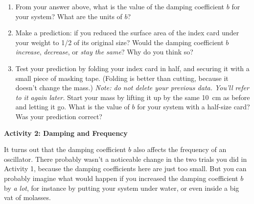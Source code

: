 \begin{enumerate}[labparts]
\item From your answer above, what is the value of the damping coefficient $b$ for your system?  What are the units of $b$? \label{b_for_full_index_card}
\answerspace{0.6in}

\item Make a prediction: if you reduced the surface area of the index card under your weight to 1/2 of its original size?  Would the damping coefficient $b$ \textit{increase}, \textit{decrease}, or \textit{stay the same}?  Why do you think so?
\answerspace{0.6in}

\item Test your prediction by folding your index card in half, and securing it with a small piece of masking tape.  (Folding is better than cutting, because it doesn't change the mass.) \textit{Note: do not delete your previous data.  You'll refer to it again later.}  Start your mass by lifting it up by the same 10~cm as before and letting it go.  What is the value of $b$ for your system with a half-size card?  Was your prediction correct?
\answerspace{1.0in}

\end{enumerate}

\textbf{Activity 2: Damping and Frequency}

It turns out that the damping coefficient $b$ also affects the frequency of an oscillator.  There probably wasn't a noticeable change in the two trials you did in Activity 1, because the damping coefficients here are just too small.  But you can probably imagine what would happen if you increased the damping coefficient $b$ by \textit{a lot}, for instance by putting your system under water, or even inside a big vat of molasses.  

